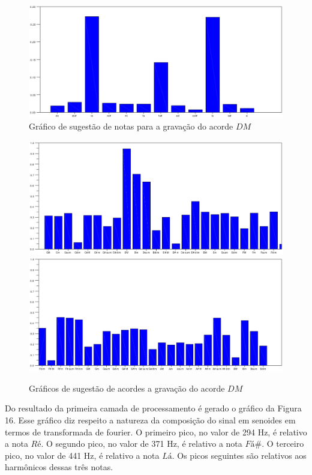 \begin{figure}[h]
	\centering
		\includegraphics[keepaspectratio=true,scale=0.49]{figuras/Dm/notas_DM.eps}
	\caption{Gráfico de sugestão de notas para a gravação do acorde $DM$}
\end{figure}

\begin{figure}[h]
	\centering
		\includegraphics[keepaspectratio=true,scale=0.45]{figuras/Dm/acordes_1_DM.eps}
		\includegraphics[keepaspectratio=true,scale=0.45]{figuras/Dm/acordes_2_DM.eps}
	\caption{Gráficos de sugestão de acordes a gravação do acorde $DM$}
\end{figure}
\newpage
Do resultado da primeira camada de processamento é gerado o gráfico da Figura 16. Esse gráfico diz respeito a natureza da composição do sinal em senoides em termos de transformada de fourier. O primeiro pico, no valor de 294 Hz, é relativo a nota $Ré$. O segundo pico, no valor de 371 Hz, é relativo a nota $Fá\#$. O terceiro pico, no valor de 441 Hz, é relativo a nota $Lá$. Os picos seguintes são relativos aos harmônicos dessas três notas.

